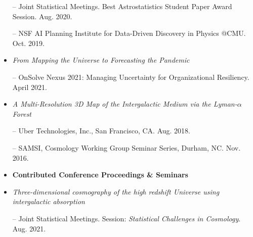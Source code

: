 \documentclass[letterpaper,10pt]{article}
\begin{document}
\begin{itemize}
\vspace{-0.3cm}

-- Joint Statistical Meetings. Best Astrostatistics Student Paper Award Session. Aug. 2020.\\

\vspace{-0.4cm}

-- NSF AI Planning Institute for Data-Driven Discovery in Physics @CMU. Oct. 2019.


\vspace{0.4cm}


\item {\it From Mapping the Universe to Forecasting the Pandemic}\\

\vspace{-0.3cm}

-- OnSolve Nexus 2021: {Managing Uncertainty for Organizational Resiliency}. April 2021.


\vspace{0.4cm}


\item {\it A Multi-Resolution 3D Map of the Intergalactic Medium via the Lyman-$\alpha$ Forest}\\

\vspace{-0.3cm}

-- Uber Technologies, Inc., San Francisco, CA. Aug. 2018.\\

\vspace{-0.4cm}

-- SAMSI, Cosmology Working Group Seminar Series, Durham, NC. Nov. 2016.


\vspace{0.4cm}


\item[] \hspace{-4ex} {\bf Contributed Conference Proceedings \& Seminars} 

\item {\it Three-dimensional cosmography of the high redshift Universe using intergalactic absorption}\\

\vspace{-0.3cm}

-- Joint Statistical Meetings. Session: {\it Statistical Challenges in Cosmology}. Aug. 2021.



\end{itemize}
\end{document}
